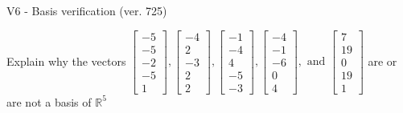 \begin{exercise}
  \begin{exerciseTitle}V6 - Basis verification (ver. 725)\end{exerciseTitle}
  \begin{exerciseStatement}
    Explain why the vectors \(\left[\begin{array}{r}
-5 \\
-5 \\
-2 \\
-5 \\
1
\end{array}\right] , \left[\begin{array}{r}
-4 \\
2 \\
-3 \\
2 \\
2
\end{array}\right] , \left[\begin{array}{r}
-1 \\
-4 \\
4 \\
-5 \\
-3
\end{array}\right] , \left[\begin{array}{r}
-4 \\
-1 \\
-6 \\
0 \\
4
\end{array}\right] , \text{ and } \left[\begin{array}{r}
7 \\
19 \\
0 \\
19 \\
1
\end{array}\right]\) are or are not a basis of \(\mathbb{R}^5\)	



\end{exerciseStatement}
\end{exercise}
